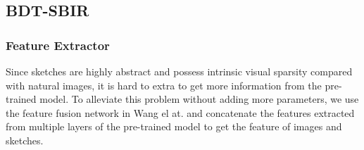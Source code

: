 \documentclass[10pt,twocolumn,letterpaper]{article}
\begin{document}

\subsection{BDT-SBIR} \label{3.2}

\subsubsection{Feature Extractor} 
Since sketches are highly abstract and possess intrinsic visual sparsity compared with natural images, it is hard to extra to get more information from the pre-trained model. To alleviate this problem without adding more parameters, we use the feature fusion network in Wang el at. \cite{wang2019stacked} and concatenate the features extracted from multiple layers of the pre-trained model to get the feature of images and sketches.
\end{document}
